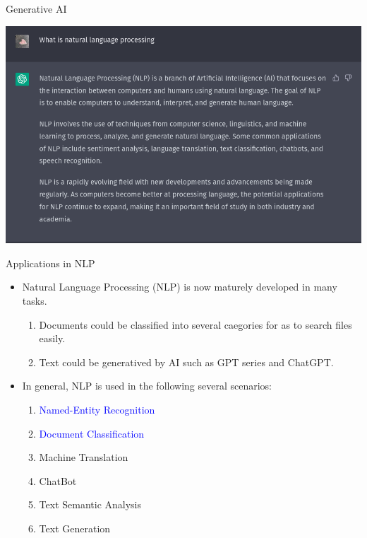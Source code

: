 \begin{frame}[fragile]{Generative AI}

  \includegraphics[scale=0.35]{../images/img_1.png}

\end{frame}

\begin{frame}[fragile]{Applications in NLP}

  \begin{itemize}
    \item Natural Language Processing (NLP) is now maturely developed in many tasks.
          \begin{enumerate}
            \item Documents could be classified into several caegories for as to search files easily.
            \item Text could be generatived by AI such as GPT series and ChatGPT.
          \end{enumerate}
    \item In general, NLP is used in the following several scenarios:
          \begin{enumerate}
            \item \textcolor{blue}{Named-Entity Recognition}
            \item \textcolor{blue}{Document Classification}
            \item Machine Translation
            \item ChatBot
            \item Text Semantic Analysis
            \item Text Generation
          \end{enumerate}
  \end{itemize}

\end{frame}